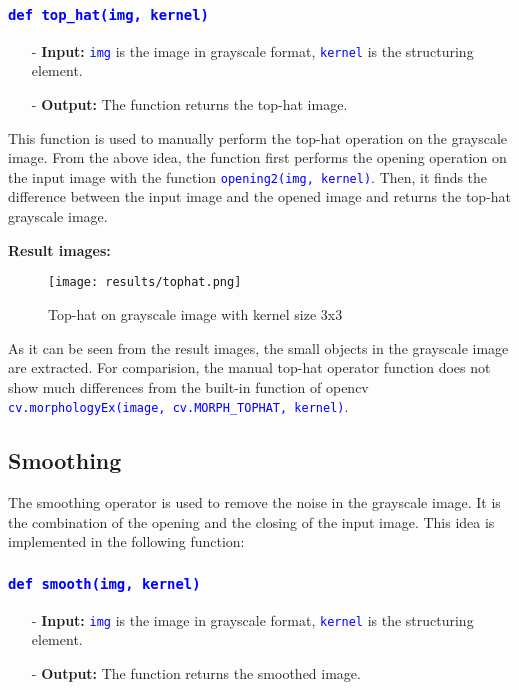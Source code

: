 \documentclass{report}
\begin{document}
\subsubsection*{\textcolor{blue}{\lstinline|def top_hat(img, kernel)|}}

\begin{itemize}
  \item[-] \textbf{Input:} \textcolor{blue}{\lstinline|img|} is the image in grayscale format, \textcolor{blue}{\lstinline|kernel|} is the structuring element.
  \item[-] \textbf{Output:} The function returns the top-hat image.
\end{itemize}

This function is used to manually perform the top-hat operation on the grayscale image. From the above idea, the function first performs the opening operation on the input image with the function \textcolor{blue}{\lstinline|opening2(img, kernel)|}. Then, it finds the difference between the input image and the opened image and returns the top-hat grayscale image.

\textbf{Result images:}
\begin{figure}[H]
    \centering
    \texttt{[image: results/tophat.png]}
    \caption{Top-hat on grayscale image with kernel size 3x3}
\end{figure}

As it can be seen from the result images, the small objects in the grayscale image are extracted. For comparision, the manual top-hat operator function does not show much differences from the built-in function of opencv \textcolor{blue}{\lstinline|cv.morphologyEx(image, cv.MORPH_TOPHAT, kernel)|}.

\pagebreak
\subsection{Smoothing}
The smoothing operator is used to remove the noise in the grayscale image. It is the combination of the opening and the closing of the input image. This idea is implemented in the following function:

\subsubsection*{\textcolor{blue}{\lstinline|def smooth(img, kernel)|}}

\begin{itemize}
  \item[-] \textbf{Input:} \textcolor{blue}{\lstinline|img|} is the image in grayscale format, \textcolor{blue}{\lstinline|kernel|} is the structuring element.
  \item[-] \textbf{Output:} The function returns the smoothed image.
\end{itemize}
\end{document}
